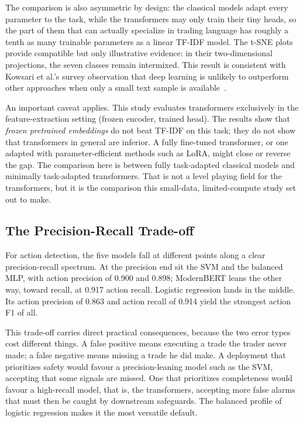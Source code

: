 The comparison is also asymmetric by design: the classical models adapt every parameter to the task, while the transformers may only train their tiny heads, so the part of them that can actually specialize in trading language has roughly a tenth as many trainable parameters as a linear TF-IDF model. The t-SNE plots provide compatible but only illustrative evidence: in their two-dimensional projections, the seven classes remain intermixed. This result is consistent with Kowsari et al.'s survey observation that deep learning is unlikely to outperform other approaches when only a small text sample is available~\cite{kowsari2019text}.

An important caveat applies. This study evaluates transformers exclusively in the feature-extraction setting (frozen encoder, trained head). The results show that \emph{frozen pretrained embeddings} do not beat TF-IDF on this task; they do not show that transformers in general are inferior. A fully fine-tuned transformer, or one adapted with parameter-efficient methods such as LoRA, might close or reverse the gap. The comparison here is between fully task-adapted classical models and minimally task-adapted transformers. That is not a level playing field for the transformers, but it is the comparison this small-data, limited-compute study set out to make.

\subsection{The Precision-Recall Trade-off}
\label{sec:discussion_tradeoff}

For action detection, the five models fall at different points along a clear precision-recall spectrum. At the precision end sit the SVM and the balanced MLP, with action precision of 0.900 and 0.898; ModernBERT leans the other way, toward recall, at 0.917 action recall. Logistic regression lands in the middle. Its action precision of 0.863 and action recall of 0.914 yield the strongest action F1 of all.

This trade-off carries direct practical consequences, because the two error types cost different things. A false positive means executing a trade the trader never made; a false negative means missing a trade he did make. A deployment that prioritizes safety would favour a precision-leaning model such as the SVM, accepting that some signals are missed. One that prioritizes completeness would favour a high-recall model, that is, the transformers, accepting more false alarms that must then be caught by downstream safeguards. The balanced profile of logistic regression makes it the most versatile default.

